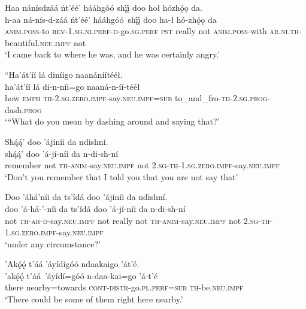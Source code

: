 \ea\label{ex:text6-4-1}
Haa nánísdzáá ńt’éé’ hááhgóó shį́į́ doo hoł hózhǫ́ǫ da.\\
\gll h-aa	ná-nís-d-záá	ńt’éé’	hááhgóó~{shį́į́}	doo	ha-ł	hó-zhǫ́ǫ	da\\
     \textsc{anim}.\textsc{poss}-to	\textsc{rev}-1.\textsc{sg}.\textsc{ni}.\textsc{perf}-\textsc{d}-go.\textsc{sg}.\textsc{perf}	\textsc{pst}	really	not	\textsc{anim}.\textsc{poss}-with	\textsc{ar}.\textsc{ni}.\textsc{th}-beautiful.\textsc{neu}.\textsc{impf}	not\\
\glt `I came back to where he was, and he was certainly angry.'
\z

\newpage
\ea\label{ex:text6-4-2}
``Ha’át’íí lá diníigo naanáníítééł.\\
\gll ha’át’íí	lá	di-n-níi=go	naaná-n-íí-tééł\\
     how	\textsc{emph}	\textsc{th}-2.\textsc{sg}.\textsc{zero}.\textsc{impf}-say.\textsc{neu}.\textsc{impf}=\textsc{sub}	to\_and\_fro-\textsc{th}-2.\textsc{sg}.\textsc{prog}-dash.\textsc{prog}\\
\glt `“What do you mean by dashing around and saying that?'
\z

\ea\label{ex:text6-4-3}
Shą́ą́’ doo ’ájíníi da ndishní.\\
\gll shą́ą́’	doo	’á-jí-níi	da	n-di-sh-ní\\
     remember	not	\textsc{th}-\textsc{anim}-say.\textsc{neu}.\textsc{impf}	not	2.\textsc{sg}-\textsc{th}-1.\textsc{sg}.\textsc{zero}.\textsc{impf}-say.\textsc{neu}.\textsc{impf}\\
\glt `Don't you remember that I told you that you are not say that'
\z

\ea\label{ex:text6-4-4}
Doo ’áhá’níi da ts’ídá doo ’ájíníi da ndishní.\\
\gll doo	’á-há-’-níi	da	ts’ídá	doo	’á-jí-níi	da	n-di-sh-ní\\
     not	\textsc{th}-\textsc{ar}-\textsc{d}-say.\textsc{neu}.\textsc{impf}	not	really	not	\textsc{th}-\textsc{anim}-say.\textsc{neu}.\textsc{impf}	not	2.\textsc{sg}-\textsc{th}-1.\textsc{sg}.\textsc{zero}.\textsc{impf}-say.\textsc{neu}.\textsc{impf}\\
\glt `under any circumstance?'
\z

\ea\label{ex:text6-4-5}
’Akǫ́ǫ́ t’áá ’áyídígóó ndaakaigo ’át’é.\\
\gll ’akǫ́ǫ́	t’áá~{’áyídí=góó}	n-daa-kai=go	’á-t’é\\
     there	nearby=towards	\textsc{cont}-\textsc{distr}-go.\textsc{pl}.\textsc{perf}=\textsc{sub}	\textsc{th}-be.\textsc{neu}.\textsc{impf}\\
\glt `There could be some of them right here nearby.'
\z

